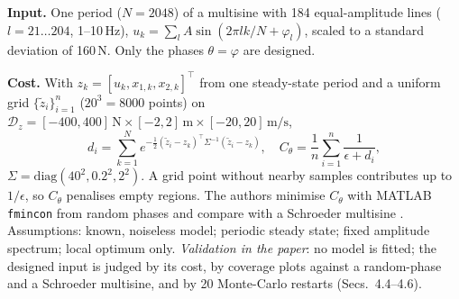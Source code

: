 \documentclass[10pt,a4paper,twocolumn]{article}
\newcommand{\Dz}{\mathcal{D}_z}
\begin{document}
\textbf{Input.} One period ($N=2048$) of a multisine with 184 equal-amplitude lines ($l=21\ldots204$,
1--10\,Hz), $u_k=\sum_l A\sin(2\pi lk/N+\varphi_l)$, scaled to a standard deviation of 160\,N. Only the
phases $\theta=\varphi$ are designed.

\textbf{Cost.} With $z_k=[u_k,x_{1,k},x_{2,k}]^\top$ from one steady-state period and a uniform grid
$\{\tilde z_i\}_{i=1}^{n}$ ($20^3=8000$ points) on
$\Dz=[-400,400]\,\mathrm{N}\times[-2,2]\,\mathrm{m}\times[-20,20]\,\mathrm{m/s}$,
\begin{equation}
d_i=\sum_{k=1}^{N}e^{-\frac12(\tilde z_i-z_k)^\top\Sigma^{-1}(\tilde z_i-z_k)},\quad
C_\theta=\frac1n\sum_{i=1}^{n}\frac{1}{\epsilon+d_i},
\label{eq:cost}\end{equation}
$\Sigma=\mathrm{diag}(40^2,0.2^2,2^2)$. A grid point without nearby samples contributes up to
$1/\epsilon$, so $C_\theta$ penalises empty regions. The authors minimise $C_\theta$ with MATLAB
\texttt{fmincon} from random phases and compare with a Schroeder multisine \citep{Schroeder1970}.
Assumptions: known, noiseless model; periodic steady state; fixed amplitude spectrum; local optimum only.
\emph{Validation in the paper}: no model is fitted; the designed input is judged by its cost, by coverage
plots against a random-phase and a Schroeder multisine, and by 20 Monte-Carlo restarts (Secs.~4.4--4.6).
\end{document}
